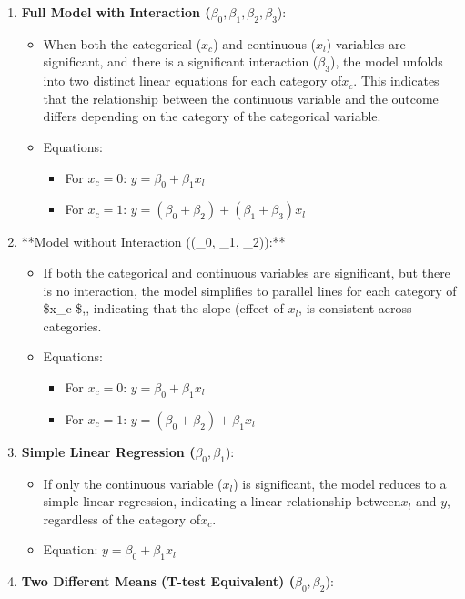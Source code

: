 \documentclass[
  letterpaper,
  DIV=11,
  numbers=noendperiod]{scrreprt}
\providecommand{\tightlist}{%
  \setlength{\itemsep}{0pt}\setlength{\parskip}{0pt}}\usepackage{longtable,booktabs,array}
\begin{document}
\begin{enumerate}
\def\labelenumi{\arabic{enumi}.}
\tightlist
\item
  \textbf{Full Model with Interaction
  (}\(\beta_0, \beta_1, \beta_2, \beta_3\)):

  \begin{itemize}
  \tightlist
  \item
    When both the categorical (\(x_c\)) and continuous (\(x_l\))
    variables are significant, and there is a significant interaction
    (\(\beta_3\)), the model unfolds into two distinct linear equations
    for each category of\(x_c\). This indicates that the relationship
    between the continuous variable and the outcome differs depending on
    the category of the categorical variable.
  \item
    Equations:

    \begin{itemize}
    \tightlist
    \item
      For \(x_c = 0\): \(y = \beta_0 + \beta_1x_l\)
    \item
      For \(x_c = 1\):
      \(y = (\beta_0 + \beta_2) + (\beta_1 + \beta_3)x_l\)
    \end{itemize}
  \end{itemize}
\item
  **Model without Interaction ((\beta\_0, \beta\_1, \beta\_2)):**

  \begin{itemize}
  \tightlist
  \item
    If both the categorical and continuous variables are significant,
    but there is no interaction, the model simplifies to parallel lines
    for each category of \$x\_c \$,, indicating that the slope (effect
    of \(x_l\), is consistent across categories.
  \item
    Equations:

    \begin{itemize}
    \tightlist
    \item
      For \(x_c = 0\): \(y = \beta_0 + \beta_1x_l\)
    \item
      For \(x_c = 1\): \(y = (\beta_0 + \beta_2) + \beta_1x_l\)
    \end{itemize}
  \end{itemize}
\item
  \textbf{Simple Linear Regression (}\(\beta_0, \beta_1\)):

  \begin{itemize}
  \tightlist
  \item
    If only the continuous variable (\(x_l\)) is significant, the model
    reduces to a simple linear regression, indicating a linear
    relationship between\(x_l\) and \(y\), regardless of the category
    of\(x_c\).
  \item
    Equation: \(y = \beta_0 + \beta_1x_l\)
  \end{itemize}
\item
  \textbf{Two Different Means (T-test Equivalent)
  (}\(\beta_0, \beta_2\)):


\end{enumerate}
\end{document}
